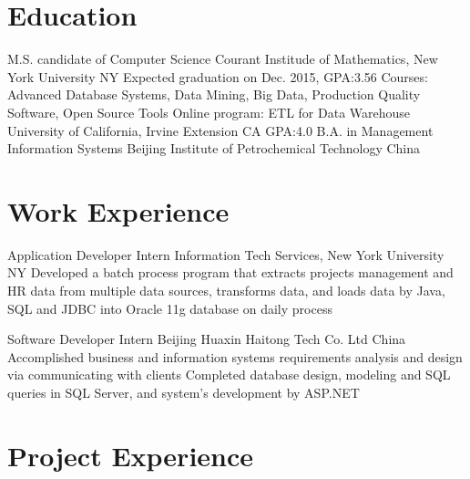 \documentclass[11pt,a4paper,sans]{moderncv}   %
\begin{document}
\maketitle

\section{Education}
{M.S. candidate of Computer Science}
{Courant Institude of Mathematics, New York University}
{NY}
{Expected graduation on Dec. 2015, GPA:3.56}
{Courses: Advanced Database Systems, Data Mining, Big Data, Production Quality Software, Open Source Tools}
{Online program: ETL for Data Warehouse}
{University of California, Irvine Extension}
{CA}
{GPA:4.0}
{}
{B.A. in Management Information Systems}
{Beijing Institute of Petrochemical Technology}
{China}
{}{}


\section{Work Experience}
\renewcommand{\baselinestretch}{1.0}

{Application Developer Intern}
{}
{Information Tech Services, New York University}
{NY}
{{Developed a batch process program that extracts projects management and HR data from multiple data sources, transforms data, and loads data by Java, SQL and JDBC into Oracle 11g database on daily process}
}


{Software Developer Intern}
{}
{Beijing Huaxin Haitong Tech Co. Ltd}
{China}
{{Accomplished business and information systems requirements analysis and design via communicating with clients}
\newline
{Completed database design, modeling and SQL queries in SQL Server, and system’s development by ASP.NET}}



\section{Project Experience}
\renewcommand{\baselinestretch}{1.0}
\end{document}
